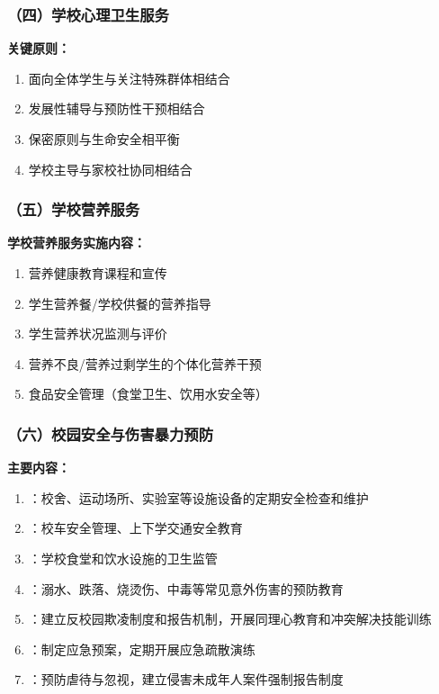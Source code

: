 \subsubsection{（四）学校心理卫生服务}

\begin{keybox}
\textbf{关键原则：}
\begin{enumerate}[leftmargin=*]
    \item 面向全体学生与关注特殊群体相结合
    \item 发展性辅导与预防性干预相结合
    \item 保密原则与生命安全相平衡
    \item 学校主导与家校社协同相结合
\end{enumerate}
\end{keybox}

\subsubsection{（五）学校营养服务}

\begin{keybox}
\textbf{学校营养服务实施内容：}
\begin{enumerate}[leftmargin=*]
    \item 营养健康教育课程和宣传
    \item 学生营养餐/学校供餐的营养指导
    \item 学生营养状况监测与评价
    \item 营养不良/营养过剩学生的个体化营养干预
    \item 食品安全管理（食堂卫生、饮用水安全等）
\end{enumerate}
\end{keybox}

\subsubsection{（六）校园安全与伤害暴力预防}

\begin{defbox}
\textbf{主要内容：}
\begin{enumerate}[leftmargin=*]
    \item {}：校舍、运动场所、实验室等设施设备的定期安全检查和维护
    \item {}：校车安全管理、上下学交通安全教育
    \item {}：学校食堂和饮水设施的卫生监管
    \item {}：溺水、跌落、烧烫伤、中毒等常见意外伤害的预防教育
    \item {}：建立反校园欺凌制度和报告机制，开展同理心教育和冲突解决技能训练
    \item {}：制定应急预案，定期开展应急疏散演练
    \item {}：预防虐待与忽视，建立侵害未成年人案件强制报告制度
\end{enumerate}
\end{defbox}

